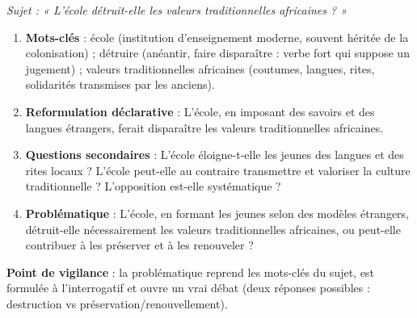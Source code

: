 \documentclass[11pt]{article}
\begin{document}
\begin{corrige}
\textit{Sujet : « L'école détruit-elle les valeurs traditionnelles africaines ? »}
\begin{enumerate}
\item \textbf{Mots-clés} : \og école \fg (institution d'enseignement moderne, souvent héritée de la colonisation) ; \og détruire \fg (anéantir, faire disparaître : verbe fort qui suppose un jugement) ; \og valeurs traditionnelles africaines \fg (coutumes, langues, rites, solidarités transmises par les anciens).
\item \textbf{Reformulation déclarative} : \og L'école, en imposant des savoirs et des langues étrangers, ferait disparaître les valeurs traditionnelles africaines. \fg
\item \textbf{Questions secondaires} : L'école éloigne-t-elle les jeunes des langues et des rites locaux ? L'école peut-elle au contraire transmettre et valoriser la culture traditionnelle ? L'opposition est-elle systématique ?
\item \textbf{Problématique} : \og L'école, en formant les jeunes selon des modèles étrangers, détruit-elle nécessairement les valeurs traditionnelles africaines, ou peut-elle contribuer à les préserver et à les renouveler ? \fg
\end{enumerate}
\textbf{Point de vigilance} : la problématique reprend les mots-clés du sujet, est formulée à l'interrogatif et ouvre un vrai débat (deux réponses possibles : destruction vs préservation/renouvellement).
\end{corrige}
\end{document}
